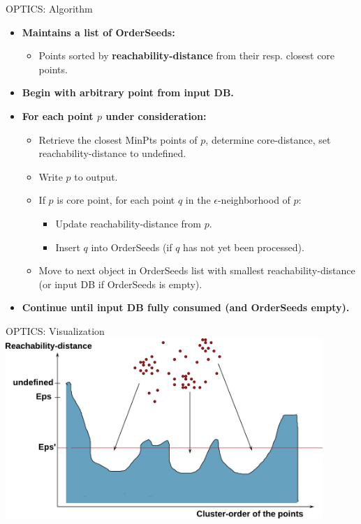 \begin{frame}{OPTICS: Algorithm}
	\begin{itemize}
		\item \textbf{Maintains a list of {\color{airforceblue}OrderSeeds}:}
		\begin{itemize}
			\item Points sorted by \textbf{reachability-distance} from their 
			resp. closest core points.
		\end{itemize}
		\item \textbf{Begin with arbitrary point from input DB.}
		\item \textbf{For each point $p$ under consideration:}
		\begin{itemize}
			\item Retrieve the closest MinPts points of $p$, determine 
			core-distance, set reachability-distance to undefined.
			\item Write $p$ to output.
			\item If $p$ is core point, for each point $q$ in the 
			$\epsilon$-neighborhood of $p$:
			\begin{itemize}
				\item Update reachability-distance from $p$.
				\item Insert $q$ into OrderSeeds (if $q$ has not yet been 
				processed).
			\end{itemize}
			\item Move to next object in OrderSeeds list with smallest 
			reachability-distance (or input DB if OrderSeeds is empty).
		\end{itemize}
		\item \textbf{Continue until input DB fully consumed (and OrderSeeds 
		empty).}
	\end{itemize}
\end{frame}

\begin{frame}{OPTICS: Visualization}
	\centering
	\includegraphics[width=12cm]{img/clusterdensity.pdf}
\end{frame}

